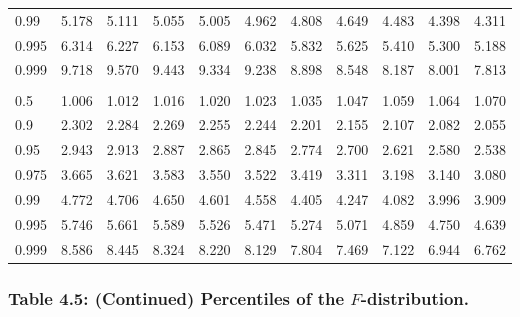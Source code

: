 \documentclass[
]{article}
\begin{document}
\begin{table}[H]
\begin{tabular}{lrrrrrrrrrr}
\hspace{1em}0.99 & 5.178 & 5.111 & 5.055 & 5.005 & 4.962 & 4.808 & 4.649 & 4.483 & 4.398 & 4.311\\
\hspace{1em}0.995 & 6.314 & 6.227 & 6.153 & 6.089 & 6.032 & 5.832 & 5.625 & 5.410 & 5.300 & 5.188\\
\hspace{1em}0.999 & 9.718 & 9.570 & 9.443 & 9.334 & 9.238 & 8.898 & 8.548 & 8.187 & 8.001 & 7.813\\
\addlinespace[0.3em]
\multicolumn{11}{l}{\textbf{$k_2=10$}}\\
\hspace{1em}0.5 & 1.006 & 1.012 & 1.016 & 1.020 & 1.023 & 1.035 & 1.047 & 1.059 & 1.064 & 1.070\\
\hspace{1em}0.9 & 2.302 & 2.284 & 2.269 & 2.255 & 2.244 & 2.201 & 2.155 & 2.107 & 2.082 & 2.055\\
\hspace{1em}0.95 & 2.943 & 2.913 & 2.887 & 2.865 & 2.845 & 2.774 & 2.700 & 2.621 & 2.580 & 2.538\\
\hspace{1em}0.975 & 3.665 & 3.621 & 3.583 & 3.550 & 3.522 & 3.419 & 3.311 & 3.198 & 3.140 & 3.080\\
\hspace{1em}0.99 & 4.772 & 4.706 & 4.650 & 4.601 & 4.558 & 4.405 & 4.247 & 4.082 & 3.996 & 3.909\\
\hspace{1em}0.995 & 5.746 & 5.661 & 5.589 & 5.526 & 5.471 & 5.274 & 5.071 & 4.859 & 4.750 & 4.639\\
\hspace{1em}0.999 & 8.586 & 8.445 & 8.324 & 8.220 & 8.129 & 7.804 & 7.469 & 7.122 & 6.944 & 6.762\\
\bottomrule
\end{tabular}
\end{table}

\newpage

\hypertarget{table-4.5-continued-percentiles-of-the-f-distribution.}{%
\subsubsection{\texorpdfstring{Table 4.5: (Continued) Percentiles of the
\(F\)-distribution.}{Table 4.5: (Continued) Percentiles of the F-distribution.}}\label{table-4.5-continued-percentiles-of-the-f-distribution.}}
\end{document}
